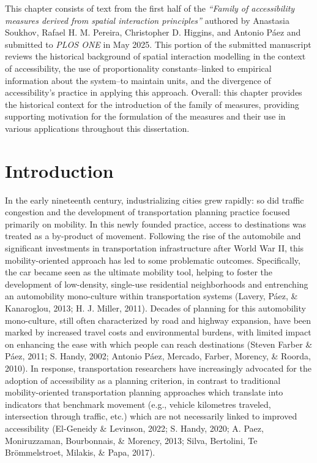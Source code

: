 \documentclass[
11pt, %
oneside, %
english, %
singlespacing, %
]{macthesis} %
\begin{document}
This chapter consists of text from the first half of the \emph{``Family of accessibility measures derived from spatial interaction principles''} authored by Anastasia Soukhov, Rafael H. M. Pereira, Christopher D. Higgins, and Antonio Páez and submitted to \emph{PLOS ONE} in May 2025. This portion of the submitted manuscript reviews the historical background of spatial interaction modelling in the context of accessibility, the use of proportionality constants--linked to empirical information about the system--to maintain units, and the divergence of accessibility's practice in applying this approach. Overall: this chapter provides the historical context for the introduction of the family of measures, providing supporting motivation for the formulation of the measures and their use in various applications throughout this dissertation.

\section{Introduction}\label{introduction}

In the early nineteenth century, industrializing cities grew rapidly: so did traffic congestion and the development of transportation planning practice focused primarily on mobility. In this newly founded practice, access to destinations was treated as a by-product of movement. Following the rise of the automobile and significant investments in transportation infrastructure after World War II, this mobility-oriented approach has led to some problematic outcomes. Specifically, the car became seen as the ultimate mobility tool, helping to foster the development of low-density, single-use residential neighborhoods and entrenching an automobility mono-culture within transportation systems (Lavery, Páez, \& Kanaroglou, 2013; H. J. Miller, 2011). Decades of planning for this automobility mono-culture, still often characterized by road and highway expansion, have been marked by increased travel costs and environmental burdens, with limited impact on enhancing the ease with which people can reach destinations (Steven Farber \& Páez, 2011; S. Handy, 2002; Antonio Páez, Mercado, Farber, Morency, \& Roorda, 2010). In response, transportation researchers have increasingly advocated for the adoption of accessibility as a planning criterion, in contrast to traditional mobility-oriented transportation planning approaches which translate into indicators that benchmark movement (e.g., vehicle kilometres traveled, intersection through traffic, etc.) which are not necessarily linked to improved accessibility (El-Geneidy \& Levinson, 2022; S. Handy, 2020; A. Paez, Moniruzzaman, Bourbonnais, \& Morency, 2013; Silva, Bertolini, Te Brömmelstroet, Milakis, \& Papa, 2017).
\end{document}
